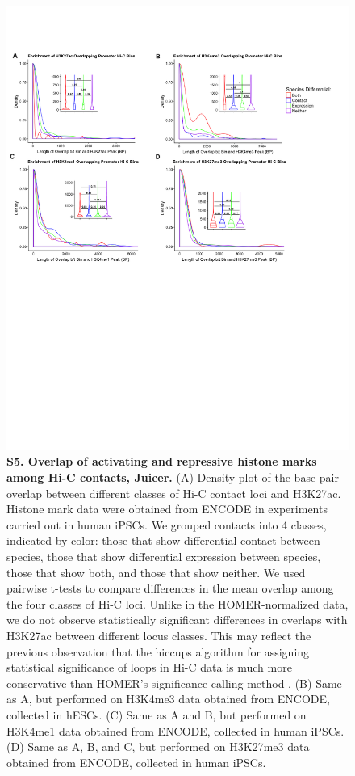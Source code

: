 \begin{figure}[!htb]
\centering
\includegraphics[width=6in]{img/figS5.pdf}
\caption[Overlap of activating and repressive histone marks among Hi-C contacts, Juicer.]{\textbf{S5. Overlap of activating and repressive histone marks among Hi-C contacts, Juicer.} (A) Density plot of the base pair overlap between different classes of Hi-C contact loci and H3K27ac. Histone mark data were obtained from ENCODE in experiments carried out in human iPSCs. We grouped contacts into 4 classes, indicated by color: those that show differential contact between species, those that show differential expression between species, those that show both, and those that show neither. We used pairwise t-tests to compare differences in the mean overlap among the four classes of Hi-C loci. Unlike in the HOMER-normalized data, we do not observe statistically significant differences in overlaps with H3K27ac between different locus classes. This may reflect the previous observation that the hiccups algorithm for assigning statistical significance of loops in Hi-C data is much more conservative than HOMER's significance calling method \cite{Forcato.2017}. (B) Same as A, but performed on H3K4me3 data obtained from ENCODE, collected in hESCs. (C) Same as A and B, but performed on H3K4me1 data obtained from ENCODE, collected in human iPSCs. (D) Same as A, B, and C, but performed on H3K27me3 data obtained from ENCODE, collected in human iPSCs.}
\label{fig:ch02-figS5}
\end{figure}

